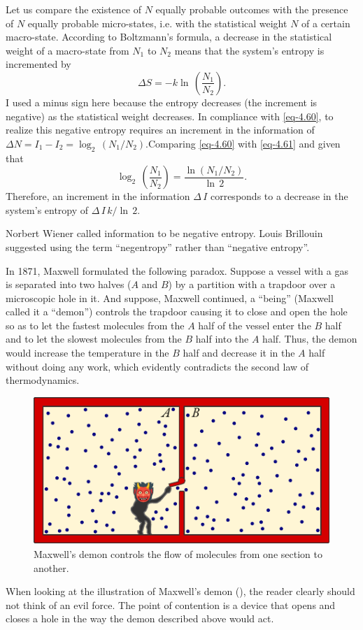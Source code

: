 Let us compare the existence of $N$ equally probable outcomes with the presence of $N$ equally probable micro-states, i.e. with the statistical weight $N$ of a certain macro-state. According to Boltzmann's formula, a decrease in the statistical weight of a macro-state from $N_{1}$ to $ N_{2}$ means that the system's entropy is incremented by
\begin{equation}%
\Delta S = - k  \ln \, \left( \frac{N_{1}}{N_{2}} \right).
\label{eq-4.61}
\end{equation}
I used a minus sign here because the entropy decreases (the increment is negative) as the statistical weight decreases. In compliance with \eqref{eq-4.60}, to realize this negative entropy requires an increment in the information of $\Delta N = I_{1}- I_{2} = \log_{2} \, \left( N_{1}/ N_{2} \right)
$.Comparing \eqref{eq-4.60} with \eqref{eq-4.61} and given that
\begin{equation*}
\log_{2} \, \left( \frac{N_{1}}{N_{2}} \right) = \frac{\ln \left( N_{1}/ N_{2} \right) }{\ln \, 2}.
\end{equation*}
Therefore, an increment in the information $\Delta \, I$ corresponds to a decrease in the system's entropy of $\Delta \, I \, k / \ln \, 2$.

Norbert Wiener called information to be negative entropy. Louis Brillouin suggested using the term ``negentropy'' rather than ``negative entropy''.

 In 1871, Maxwell formulated the following paradox. Suppose a vessel with a gas is separated into two halves ($A$ and $B$) by a partition with a trapdoor over a microscopic hole in it. And suppose, Maxwell continued, a ``being'' (Maxwell called it a ``demon'') controls the trapdoor causing it to close and open the hole so as to let the fastest molecules from the $A$ half of the vessel enter the $B$ half and to let the slowest molecules from the $B$ half into the $A$ half. Thus, the demon would increase the temperature in the $B$ half and decrease it in the $A$ half without doing any work, which evidently contradicts the second law of thermodynamics.
\begin{figure}[!ht]
 \centering
 \includegraphics[width=0.9\linewidth]{figures/maxwell-demon.pdf}
\caption{Maxwell's demon controls the flow of molecules from one section to another.\label{max-demon}}
 \end{figure}
When looking at the illustration of Maxwell's demon (), the reader clearly should not think of an evil force. The point of contention is a device that opens and closes a hole in the way the demon described above would act.

